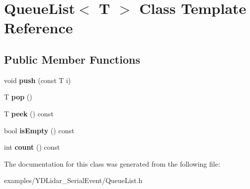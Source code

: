 \hypertarget{class_queue_list}{}\section{Queue\+List$<$ T $>$ Class Template Reference}
\label{class_queue_list}
\subsection*{Public Member Functions}
\begin{DoxyCompactItemize}
\item 
void {\bfseries push} (const T i)\hypertarget{class_queue_list_a47c26444335b418138450ba8bfb5ba13}{}\label{class_queue_list_a47c26444335b418138450ba8bfb5ba13}

\item 
T {\bfseries pop} ()\hypertarget{class_queue_list_abf5fba15da77e79d28cb3f593f5fd0a7}{}\label{class_queue_list_abf5fba15da77e79d28cb3f593f5fd0a7}

\item 
T {\bfseries peek} () const \hypertarget{class_queue_list_aed5225e36fcedf948a08d8c6b856be9f}{}\label{class_queue_list_aed5225e36fcedf948a08d8c6b856be9f}

\item 
bool {\bfseries is\+Empty} () const \hypertarget{class_queue_list_ab6c04bc7c2b54ac9060f8a0f1b738351}{}\label{class_queue_list_ab6c04bc7c2b54ac9060f8a0f1b738351}

\item 
int {\bfseries count} () const \hypertarget{class_queue_list_a078a1e9b8021ea45c9b1110d09602ef9}{}\label{class_queue_list_a078a1e9b8021ea45c9b1110d09602ef9}

\end{DoxyCompactItemize}


The documentation for this class was generated from the following file\+:\begin{DoxyCompactItemize}
\item 
examples/\+Y\+D\+Lidar\+\_\+\+Serial\+Event/Queue\+List.\+h\end{DoxyCompactItemize}
